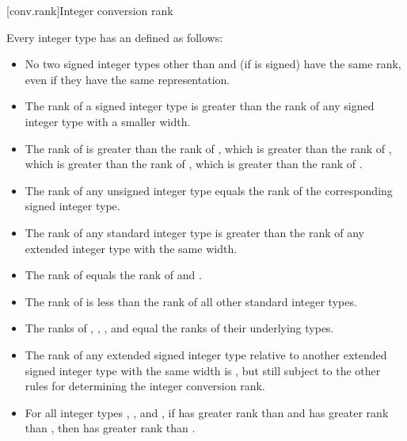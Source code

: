 [conv.rank]{Integer conversion rank}%

\pnum
Every integer type has an  defined as follows:
\begin{itemize}
\item No two signed integer types other than  and  (if  is signed) have the same rank, even if they have
the same representation.

\item The rank of a signed integer type is greater than the rank
of any signed integer type with a smaller width.

\item The rank of  is greater
than the rank of , which is greater than
the rank of , which is greater than the rank of
, which is greater than the rank of
.

\item The rank of any unsigned integer type equals the rank of the
corresponding signed integer type.

\item The rank of any standard integer type is greater than the
rank of any extended integer type with the same width.

\item The rank of  equals the rank of 
and .

\item The rank of  is less than the rank of all other
standard integer types.

\item
{}%
%
%
The ranks of , , , and
 equal the ranks of their underlying
types.

\item The rank of any extended signed integer type relative to another
extended signed integer type with the same width is , but still subject to the other rules for determining the integer
conversion rank.

\item For all integer types , , and , if
 has greater rank than  and  has greater
rank than , then  has greater rank than
.
\end{itemize}

